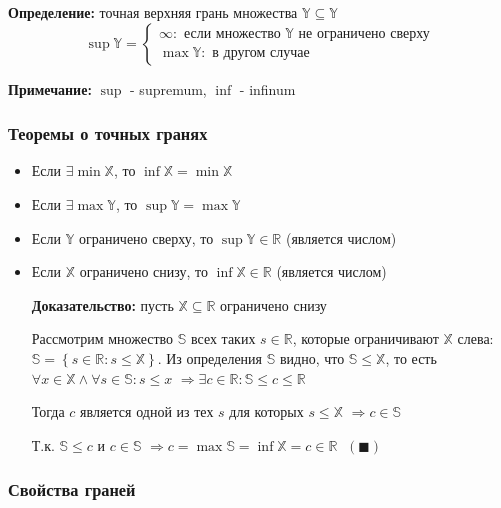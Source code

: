 \documentclass[class=article,a4paper,12pt,crop=false]{standalone}
\begin{document}
\textbf{Определение:} точная верхняя грань множества $\mathbb{Y} \subseteq \mathbb{Y}$
\begin{equation}
  \sup{\mathbb{Y}} =
  \begin{cases}
    \infty: \text{ если множество } \mathbb{Y} \text{ не ограничено сверху} \\
    \max{\mathbb{Y}}: \text{ в другом случае}
  \end{cases}
\end{equation}

\textbf{Примечание:} $\sup$ - supremum, $\inf$ - infinum

\subsubsection{Теоремы о точных гранях}

\begin{itemize}
  \item {
    Если $\exists \min{\mathbb{X}}$, то $\inf{\mathbb{X}} = \min{\mathbb{X}}$
  }
  \item {
    Если $\exists \max{\mathbb{Y}}$, то $\sup{\mathbb{Y}} = \max{\mathbb{Y}}$
  }
  \item {
    Если $\mathbb{Y}$ ограничено сверху, то $\sup{\mathbb{Y}} \in \mathbb{R}$ (является числом)
  }
  \item {
    Если $\mathbb{X}$ ограничено снизу, то $\inf{\mathbb{X}} \in \mathbb{R}$ (является числом)
  
    \textbf{Доказательство:} пусть $\mathbb{X} \subseteq \mathbb{R}$ ограничено снизу
    
    Рассмотрим множество $\mathbb{S}$ всех таких $s \in \mathbb{R}$,
    которые ограничивают $\mathbb{X}$ слева:
    $\mathbb{S} = \left\{s \in \mathbb{R}: s \leq \mathbb{X}\right\}$.
    Из определения $\mathbb{S}$ видно, что $\mathbb{S} \leq \mathbb{X}$,
    то есть $\forall x \in \mathbb{X} \land \forall s \in \mathbb{S}: s \leq x$
    $\Rightarrow \exists c \in \mathbb{R}: \mathbb{S} \leq c \leq \mathbb{R}$
  
    Тогда $c$ является одной из тех $s$ для которых $s \leq \mathbb{X}$
    $\Rightarrow c \in \mathbb{S}$

    Т.к. $\mathbb{S} \leq c$ и $c \in \mathbb{S}$
    $\Rightarrow c = \max{\mathbb{S}} = \inf{\mathbb{X}} = c \in \mathbb{R}$
    $\; (\blacksquare)$
  }
\end{itemize}

\subsubsection{Свойства граней}
\end{document}
